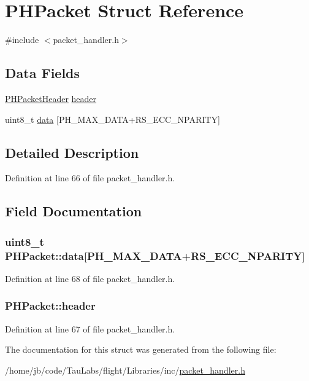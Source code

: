 \hypertarget{struct_p_h_packet}{\section{\-P\-H\-Packet \-Struct \-Reference}
\label{struct_p_h_packet}
}


{\ttfamily \#include $<$packet\-\_\-handler.\-h$>$}

\subsection*{\-Data \-Fields}
\begin{DoxyCompactItemize}
\item 
\hyperlink{struct_p_h_packet_header}{\-P\-H\-Packet\-Header} \hyperlink{struct_p_h_packet_a930af3e24c9d3aa4a29fa0e72b62f12b}{header}
\item 
uint8\-\_\-t \hyperlink{struct_p_h_packet_ab75944547b63cd1feaaa0727b7505c52}{data} \mbox{[}\-P\-H\-\_\-\-M\-A\-X\-\_\-\-D\-A\-T\-A+\-R\-S\-\_\-\-E\-C\-C\-\_\-\-N\-P\-A\-R\-I\-T\-Y\mbox{]}
\end{DoxyCompactItemize}


\subsection{\-Detailed \-Description}


\-Definition at line 66 of file packet\-\_\-handler.\-h.



\subsection{\-Field \-Documentation}
\hypertarget{struct_p_h_packet_ab75944547b63cd1feaaa0727b7505c52}{
\subsubsection[{data}]{\setlength{\rightskip}{0pt plus 5cm}uint8\-\_\-t {\bf \-P\-H\-Packet\-::data}\mbox{[}\-P\-H\-\_\-\-M\-A\-X\-\_\-\-D\-A\-T\-A+\-R\-S\-\_\-\-E\-C\-C\-\_\-\-N\-P\-A\-R\-I\-T\-Y\mbox{]}}}\label{struct_p_h_packet_ab75944547b63cd1feaaa0727b7505c52}


\-Definition at line 68 of file packet\-\_\-handler.\-h.

\hypertarget{struct_p_h_packet_a930af3e24c9d3aa4a29fa0e72b62f12b}{
\subsubsection[{header}]{ {\bf \-P\-H\-Packet\-::header}}}\label{struct_p_h_packet_a930af3e24c9d3aa4a29fa0e72b62f12b}


\-Definition at line 67 of file packet\-\_\-handler.\-h.



\-The documentation for this struct was generated from the following file\-:\begin{DoxyCompactItemize}
\item 
/home/jb/code/\-Tau\-Labs/flight/\-Libraries/inc/\hyperlink{packet__handler_8h}{packet\-\_\-handler.\-h}\end{DoxyCompactItemize}
